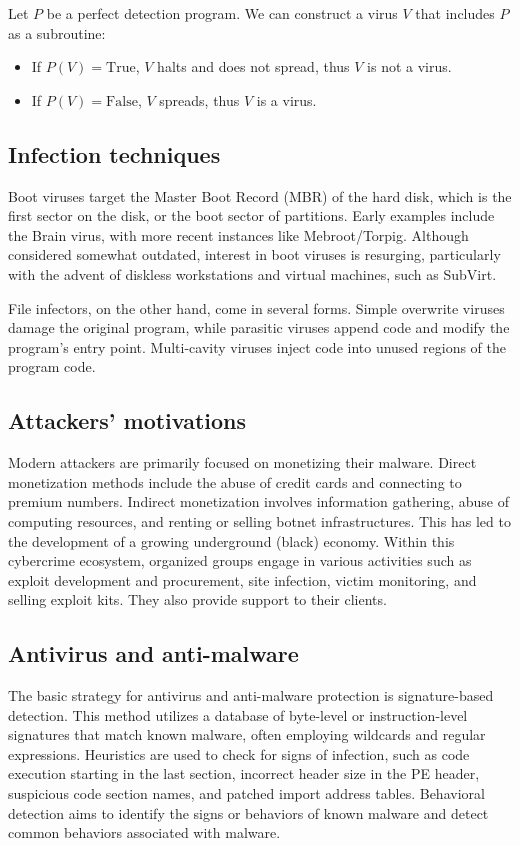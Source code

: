 Let $P$ be a perfect detection program.
We can construct a virus $V$ that includes $P$ as a subroutine:
\begin{itemize}
    \item If $P(V)=\text{True}$, $V$ halts and does not spread, thus $V$ is not a virus.
    \item If $P(V)=\text{False}$, $V$ spreads, thus $V$ is a virus.
\end{itemize}

\subsection{Infection techniques}
Boot viruses target the Master Boot Record (MBR) of the hard disk, which is the first sector on the disk, or the boot sector of partitions. 
Early examples include the Brain virus, with more recent instances like Mebroot/Torpig.
Although considered somewhat outdated, interest in boot viruses is resurging, particularly with the advent of diskless workstations and virtual machines, such as SubVirt.

File infectors, on the other hand, come in several forms. 
Simple overwrite viruses damage the original program, while parasitic viruses append code and modify the program's entry point. 
Multi-cavity viruses inject code into unused regions of the program code.

\subsection{Attackers' motivations}
Modern attackers are primarily focused on monetizing their malware.
Direct monetization methods include the abuse of credit cards and connecting to premium numbers. 
Indirect monetization involves information gathering, abuse of computing resources, and renting or selling botnet infrastructures. 
This has led to the development of a growing underground (black) economy. 
Within this cybercrime ecosystem, organized groups engage in various activities such as exploit development and procurement, site infection, victim monitoring, and selling exploit kits. 
They also provide support to their clients.

\subsection{Antivirus and anti-malware}
The basic strategy for antivirus and anti-malware protection is signature-based detection. 
This method utilizes a database of byte-level or instruction-level signatures that match known malware, often employing wildcards and regular expressions. 
Heuristics are used to check for signs of infection, such as code execution starting in the last section, incorrect header size in the PE header, suspicious code section names, and patched import address tables. 
Behavioral detection aims to identify the signs or behaviors of known malware and detect common behaviors associated with malware.